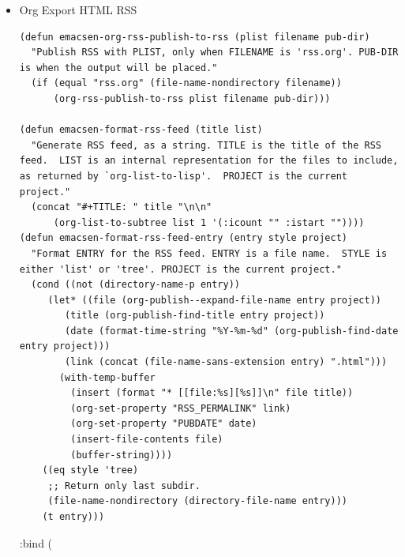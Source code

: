 \documentclass[11pt]{article}
\begin{document}
\begin{itemize}
\begin{itemize}
\begin{verbatim}
    (concat
     (format "#+title: %s\n" title)
     "#+author: emsenn\n"
     "#+email: emsenn@emsenn.net\n"
     "#+options: timestamp:nil date:nil\n"
     (format "#+date: %s\n" (format-time-string "[%Y-%m-%d %a %H:%M:%S]" (current-time)))
     "#+roam_tags: meta\n"
     (org-list-to-org (cons (car sitemap) posts)))))
\end{verbatim}
\item Org Export HTML RSS
\label{sec:org328fddf}
\begin{verbatim}
(defun emacsen-org-rss-publish-to-rss (plist filename pub-dir)
  "Publish RSS with PLIST, only when FILENAME is 'rss.org'. PUB-DIR is when the output will be placed."
  (if (equal "rss.org" (file-name-nondirectory filename))
      (org-rss-publish-to-rss plist filename pub-dir)))

(defun emacsen-format-rss-feed (title list)
  "Generate RSS feed, as a string. TITLE is the title of the RSS feed.  LIST is an internal representation for the files to include, as returned by `org-list-to-lisp'.  PROJECT is the current project."
  (concat "#+TITLE: " title "\n\n"
	  (org-list-to-subtree list 1 '(:icount "" :istart ""))))
(defun emacsen-format-rss-feed-entry (entry style project)
  "Format ENTRY for the RSS feed. ENTRY is a file name.  STYLE is either 'list' or 'tree'. PROJECT is the current project."
  (cond ((not (directory-name-p entry))
	 (let* ((file (org-publish--expand-file-name entry project))
		(title (org-publish-find-title entry project))
		(date (format-time-string "%Y-%m-%d" (org-publish-find-date entry project)))
		(link (concat (file-name-sans-extension entry) ".html")))
	   (with-temp-buffer
	     (insert (format "* [[file:%s][%s]]\n" file title))
	     (org-set-property "RSS_PERMALINK" link)
	     (org-set-property "PUBDATE" date)
	     (insert-file-contents file)
	     (buffer-string))))
	((eq style 'tree)
	 ;; Return only last subdir.
	 (file-name-nondirectory (directory-file-name entry)))
	(t entry)))    
\end{verbatim}
:bind (
\end{itemize}


\end{itemize}
\end{document}
